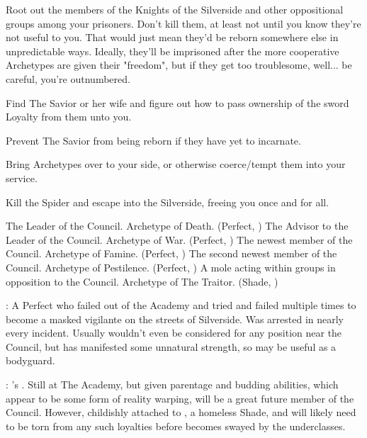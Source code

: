 \documentclass[blue]{Silversiders}
\begin{document}
\begin{itemz}[Goals]
  \item Root out the members of the Knights of the Silverside and other oppositional groups among your prisoners. Don't kill them, at least not until you know they're not useful to you. That would just mean they'd be reborn somewhere else in unpredictable ways. Ideally, they'll be imprisoned after the more cooperative Archetypes are given their "freedom", but if they get too troublesome, well... be careful, you're outnumbered.
  \item Find The Savior or her wife and figure out how to pass ownership of the sword Loyalty from them unto you.
  \item Prevent The Savior from being reborn if they have yet to incarnate. 
  \item Bring Archetypes over to your side, or otherwise coerce/tempt them into your service.
  \item Kill the Spider and escape into the Silverside, freeing you once and for all.
\end{itemz}

\begin{members}
	\member{\cDeath{}} The Leader of the Council. Archetype of Death. (Perfect, \cDeath{\Sex})
	\member{\cWar{}} The Advisor to the Leader of the Council. Archetype of War. (Perfect, \cWar{\Sex})
	\member{\cFamine{}} The newest member of the Council. Archetype of Famine. (Perfect, \cFamine{\Sex})
	\member{\cPestilence{}} The second newest member of the Council. Archetype of Pestilence. (Perfect, \cPestilence{\Sex})
	\member{\cTraitor{}} A mole acting within groups in opposition to the Council. Archetype of The Traitor. (Shade, \cTraitor{\Sex})
	
\end{members}

\begin{itemz}
	\item \cMuscle{}: A \cMuscle{\sex} Perfect who failed out of the Academy and tried and failed multiple times to become a masked vigilante on the streets of Silverside. Was arrested in nearly every incident. Usually wouldn't even be considered for any position near the Council, but has manifested some unnatural strength, so \cMuscle{\they} may be useful as a bodyguard.
	\item \cTruth{}: \cDeath{}'s \cTruth{\offspring}. Still at The Academy, but given \cTruth{\their} parentage and budding abilities, which appear to be some form of reality warping, will be a great future member of the Council. However, \cTruth{\theyre} childishly attached to \cWisdom{}, a homeless Shade, and will likely need to be torn from any such loyalties before \cTruth{\they} becomes swayed by the underclasses.
					
\end{itemz}
\end{document}
